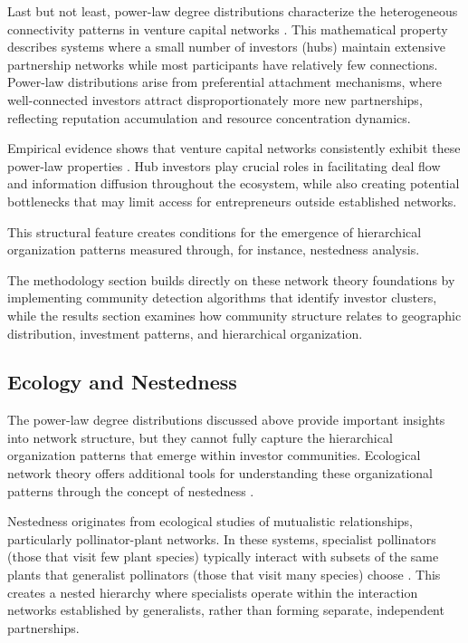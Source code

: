 Last but not least, power-law degree distributions characterize the heterogeneous connectivity patterns in venture capital networks \cite{Bygrave1987}. This mathematical property describes systems where a small number of investors (hubs) maintain extensive partnership networks while most participants have relatively few connections. Power-law distributions arise from preferential attachment mechanisms, where well-connected investors attract disproportionately more new partnerships, reflecting reputation accumulation and resource concentration dynamics.

Empirical evidence shows that venture capital networks consistently exhibit these power-law properties \cite{Dalle2025}. Hub investors play crucial roles in facilitating deal flow and information diffusion throughout the ecosystem, while also creating potential bottlenecks that may limit access for entrepreneurs outside established networks. 

This structural feature creates conditions for the emergence of hierarchical organization patterns measured through, for instance, nestedness analysis.

The methodology section builds directly on these network theory foundations by implementing community detection algorithms that identify investor clusters, while the results section examines how community structure relates to geographic distribution, investment patterns, and hierarchical organization.

\subsection{Ecology and Nestedness}

The power-law degree distributions discussed above provide important insights into network structure, but they cannot fully capture the hierarchical organization patterns that emerge within investor communities. Ecological network theory offers additional tools for understanding these organizational patterns through the concept of nestedness \cite{Mariani2019}.

Nestedness originates from ecological studies of mutualistic relationships, particularly pollinator-plant networks. In these systems, specialist pollinators (those that visit few plant species) typically interact with subsets of the same plants that generalist pollinators (those that visit many species) choose \cite{Mariani2019}. This creates a nested hierarchy where specialists operate within the interaction networks established by generalists, rather than forming separate, independent partnerships.

